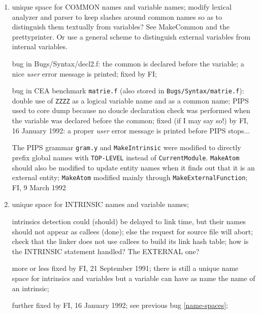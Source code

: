 \begin{enumerate}

  \item \label{name-spaces}
        unique space for COMMON names and variable names; modify lexical
        analyzer and parser to keep slashes around common names so as to
        distinguish them textually from variables? See MakeCommon and the
        prettyprinter. Or use a general scheme to distinguish external
        variables from internal variables.

        bug in Bugs/Syntax/decl2.f: the common is declared before the variable;
        a nice {\em user} error message is printed; fixed by FI;

        bug in CEA benchmark \verb+matrie.f+
        (also stored in \verb+Bugs/Syntax/matrie.f+): 
        double use of \verb+ZZZZ+ as
        a logical variable name and as a common name; PIPS used to core dump
        because no doucle declaration check was performed when the
        variable was declared before the common; fixed (if I may say so!)
        by FI, 16 January 1992: a proper {\em user} error message 
        is printed before PIPS stops...

        The PIPS grammar \verb+gram.y+ and \verb+MakeIntrinsic+ were
        modified to directly prefix global names
        with \verb+TOP-LEVEL+ instead of \verb+CurrentModule+.
        \verb+MakeAtom+ should also be modified to update entity names
        when it finds out that it is an external entity; \verb+MakeAtom+
        modified mainly through \verb+MakeExternalFunction+; FI, 9 March 1992

  \item unique space for INTRINSIC names and variable names; 

        intrinsics 
        detection could (should) be delayed to link time, but their names
        should not appear as callees (done); else the request for source file
        will abort; check that the linker does not use callees to build
        its link hash table; how is the INTRINSIC statement handled? The
        EXTERNAL one?

        more or less fixed by FI, 21 September 1991; there is still a unique
        name space for intrinsics and variables but a variable can have
        as name the name of an intrinsic;

        further fixed by FI, 16 January 1992; see previous 
        bug \ref{name-spaces};


\end{enumerate}
